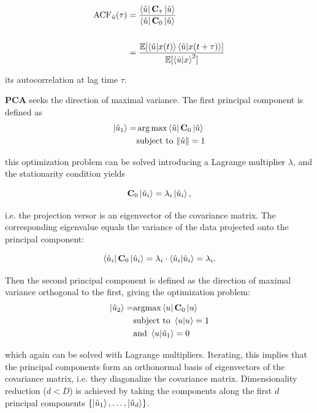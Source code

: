 \begin{align}
    \label{eq:autocorrelation}
    \textrm{ACF}_{\hat{u}}(\tau) &=\frac{\bra{\hat{u}}\mathbf{C}_{\tau}\ket{\hat{u}}}{\bra{\hat{u}}\mathbf{C}_{0}\ket{\hat{u}}} \notag \\
    \\ &= \frac{\mathbb{E}[\braket{\hat{u}|x(t)}\braket{\hat{u}|x(t+\tau)}]}{\mathbb{E}[\braket{\hat{u}|x}^2]} \notag 
\end{align}

its autocorrelation at lag time $\tau$.

\vspace{0.5em}

\noindent \textbf{PCA} seeks the direction of maximal variance. The first principal component is defined as
\begin{align}
\ket{\hat{u}_1} =& \arg\max \bra{\hat{u}}\mathbf{C}_0\ket{\hat{u}}  \notag \\
&\text{subject to}\,\,\|\hat{u}\|=1
\end{align}

this optimization problem can be solved introducing a Lagrange multiplier $\lambda$, and the stationarity condition yields

\begin{equation}
\mathbf{C}_0 \ket{\hat{u}_i} =\lambda_i \ket{\hat{u}_i},
\end{equation}

i.e. the projection versor is an eigenvector of the covariance matrix. The corresponding eigenvalue equals the variance of the data projected onto the principal component:

\begin{equation*}
\bra{\hat{u}_i}\mathbf{C}_0\ket{\hat{u}_i} = \lambda_i \cdot \braket{\hat{u}_i|\hat{u}_i} = \lambda_i.
\end{equation*}

Then the second principal component is defined as the direction of maximal variance orthogonal to the first, giving the 
optimization problem:
\begin{align}
\ket{\hat{u}_2} = &\text{argmax}\bra{u}\mathbf{C}_0\ket{u} \notag \\
&\text{subject to}  \,\, \braket{u|u} = 1 \notag \\
&\text{and}   \,\, \braket{u|\hat{u}_1} = 0
\end{align}

which again can be solved with Lagrange multipliers. Iterating, this implies that the principal components form an orthonormal basis of eigenvectors of the covariance matrix, i.e. they diagonalize the covariance matrix.
Dimensionality reduction ($d < D$) is achieved by taking the components along the first $d$ 
principal components $\{\ket{\hat{u}_1}, \ldots, \ket{\hat{u}_d}\}$.


